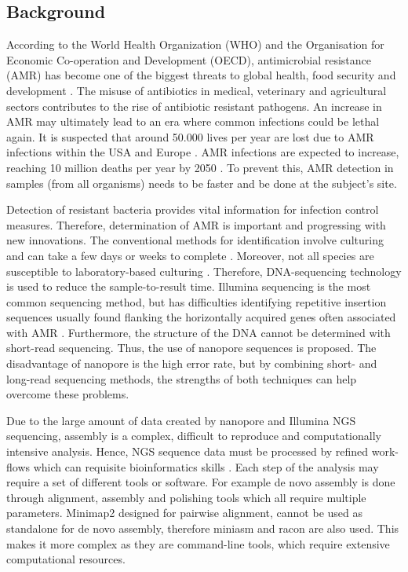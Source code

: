 \documentclass[a4paper,num-refs]{oup-contemporary}
\begin{document}
\subsection{Background}
According to the World Health Organization (WHO) and the Organisation for Economic Co-operation and Development (OECD), antimicrobial resistance (AMR) has become one of the biggest threats to global health, food security and development \cite{OrganisationforEconomicCo-operationandDevelopment2017, WorldHealthOrganization2018}. The misuse of antibiotics in medical, veterinary and agricultural sectors contributes to the rise of antibiotic resistant pathogens. An increase in AMR may ultimately lead to an era where common infections could be lethal again. It is suspected that around 50.000 lives per year are lost due to AMR infections within the USA and Europe \cite{Simlai2016}. AMR infections are expected to increase, reaching 10 million deaths per year by 2050 \cite{ONeil2014}. To prevent this, AMR detection in samples (from all organisms) needs to be faster and be done at the subject's site.

Detection of resistant bacteria provides vital information for infection control measures. Therefore, determination of AMR is important and progressing with new innovations. The conventional methods for identification involve culturing and can take a few days or weeks to complete \cite{Quick2015}. Moreover, not all species are susceptible to laboratory-based culturing \cite{Mitsuhashi2017}. Therefore, DNA-sequencing technology is used to reduce the sample-to-result time. Illumina sequencing is the most common sequencing method, but has difficulties identifying repetitive insertion sequences usually found flanking the horizontally acquired genes often associated with AMR \cite{Ashton2014}. Furthermore, the structure of the DNA cannot be determined with short-read sequencing. Thus, the use of nanopore sequences is proposed. The disadvantage of nanopore is the high error rate, but by combining short- and long-read sequencing methods, the strengths of both techniques can help overcome these problems.

Due to the large amount of data created by nanopore and Illumina NGS sequencing, assembly is a complex, difficult to reproduce and computationally intensive analysis. Hence, NGS sequence data must be processed by refined work-flows which can requisite bioinformatics skills \cite{Hemlata2016}. Each step of the analysis may require a set of different tools or software. For example de novo assembly is done through alignment, assembly and polishing tools which all require multiple parameters. Minimap2 designed for pairwise alignment, cannot be used as standalone for de novo assembly, therefore miniasm and racon are also used. This makes it more complex as they are command-line tools, which require extensive computational resources. 
\end{document}
